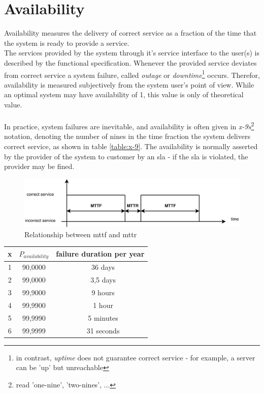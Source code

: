 \section{Availability}

Availability measures the delivery of correct service as a fraction of the time that the system is ready to provide a service. 
\\
The services provided by the system through it's service interface to the user(s) 
is described by the functional specification. Whenever the provided service
deviates from correct service a system failure, called \textit{outage} or \textit{downtime}\footnote{in contrast, \textit{uptime} does not guarantee correct
service - for example, a server can be 'up' but unreachable} occurs. Therefor, availability is measured subjectively from the system user's point
of view.
While an optimal system may have availability of 1,
this value is only of theoretical value.
\\
\\
In practice, system failures are inevitable, and availability is often given in \textit{x-9s}\footnote{read 'one-nine', 'two-nines', ...} notation, denoting the 
number of nines in the time fraction the system delivers correct service, as shown in table \ref{table:x-9}.
The availability is normally asserted by the provider of the system to customer by an
\gls{sla} - if the \gls{sla} is violated, the provider may be fined.
\begin{figure}
    \centering
    \includegraphics[width=1\textwidth]{figures/availability}
    \caption{Relationship between \gls{mttf} and \gls{mttr}}
    \label{fig:relmttfmttr}
\end{figure}
\begin{center}
\begin{tabular}{ c | c c  }
 \label{table:x-9}
  x & $P_{availability}$ & failure duration per year \\ \hline
  1 & 90,0000    & ~ 36 days \\
  2 & 99,0000    & ~ 3,5 days  \\
  3 & 99,9000    & ~ 9 hours \\
  4 & 99,9900    & ~ 1 hour \\
  5 & 99,9990    & ~ 5 minutes \\
  6 & 99,9999    & ~ 31 seconds \\ 
  
\end{tabular}
\end{center}

